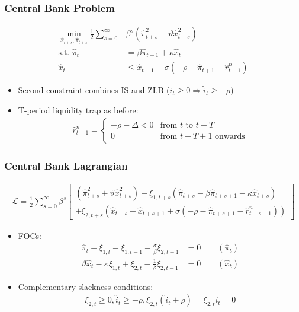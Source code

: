 \documentclass[english,xcolor=svgnames]{beamer}
\begin{document}
\begin{frame}
\frametitle{Central Bank Problem}
\begin{align*}
\min_{\hat{x}_{t+s},\hat{\pi}_{t+s}}\frac{1}{2}\sum_{s=0}^{\infty}&\beta^s\left(\hat{\pi}_{t+s}^2 + \vartheta \hat{x}_{t+s}^{2}\right) \\
	\text{s.t. }\hat{\pi}_t&=\beta \hat{\pi}_{t+1} +  \kappa \hat{x}_{t} \\
	\hat{x}_t &\le  \hat{x}_{t+1} -\sigma(-\rho-\hat{\pi}_{t+1}-\hat{r}_{t+1}^n) 
\end{align*}
\begin{itemize}
	\item Second constraint combines IS and ZLB ($i_t\ge 0 \Rightarrow \hat{i}_t \ge -\rho $)
	\item T-period liquidity trap as before:
	\begin{align*}
		\hat{r}_{t+1}^n =  \begin{cases} -\rho-\Delta<0 & \text{from } t \text{ to } t+T \\  0 & \text{from } t+T+1 \text{ onwards}\end{cases}
	\end{align*}
\end{itemize}	
\end{frame}


\begin{frame}
\frametitle{Central Bank Lagrangian}
\begin{align*}
\mathcal{L}=\frac{1}{2}\sum_{s=0}^{\infty}\beta^s\begin{bmatrix}\left(\hat{\pi}_{t+s}^2 + \vartheta \hat{x}_{t+s}^{2}\right)+\xi_{1,t+s}\left(\hat{\pi}_{t+s}-\beta \hat{\pi}_{t+s+1}-\kappa \hat{x}_{t+s}\right) \\
	+\xi_{2,t+s}\left(\hat{x}_{t+s} -  \hat{x}_{t+s+1} +\sigma(-\rho-\hat{\pi}_{t+s+1}-\hat{r}_{t+s+1}^n) \right)\end{bmatrix}
\end{align*}
\begin{itemize}
	\item FOCs:
	\begin{align*}
		\hat{\pi}_{t}+\xi_{1,t}-\xi_{1,t-1}-\frac{\sigma}{\beta}\xi_{2,t-1} &=0\qquad (\hat{\pi}_t) \\
		\vartheta\hat{x}_{t}-\kappa\xi_{1,t}+\xi_{2,t}-\frac{1}{\beta}\xi_{2,t-1} &=0\qquad (\hat{x}_t) 
	\end{align*}
	\item Complementary slackness conditions:
	\begin{align*}
		\xi_{2,t}\ge 0, \hat{i}_t\ge -\rho ,\xi_{2,t}(\hat{i}_t+\rho)=\xi_{2,t}i_t=0
	\end{align*}
\end{itemize}	
\end{frame}
\end{document}
